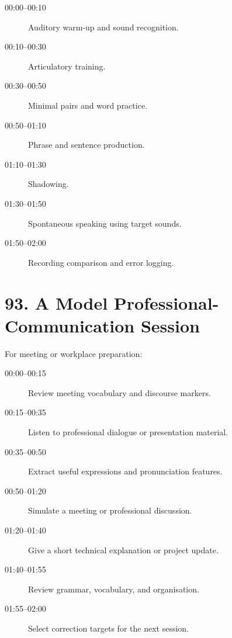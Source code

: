 \begin{description}

    \item[00:00--00:10]
    Auditory warm-up and sound recognition.

    \item[00:10--00:30]
    Articulatory training.

    \item[00:30--00:50]
    Minimal pairs and word practice.

    \item[00:50--01:10]
    Phrase and sentence production.

    \item[01:10--01:30]
    Shadowing.

    \item[01:30--01:50]
    Spontaneous speaking using target sounds.

    \item[01:50--02:00]
    Recording comparison and error logging.

\end{description}

\section*{93. A Model Professional-Communication Session}

For meeting or workplace preparation:

\begin{description}

    \item[00:00--00:15]
    Review meeting vocabulary and discourse markers.

    \item[00:15--00:35]
    Listen to professional dialogue or presentation material.

    \item[00:35--00:50]
    Extract useful expressions and pronunciation features.

    \item[00:50--01:20]
    Simulate a meeting or professional discussion.

    \item[01:20--01:40]
    Give a short technical explanation or project update.

    \item[01:40--01:55]
    Review grammar, vocabulary, and organisation.

    \item[01:55--02:00]
    Select correction targets for the next session.

\end{description}

